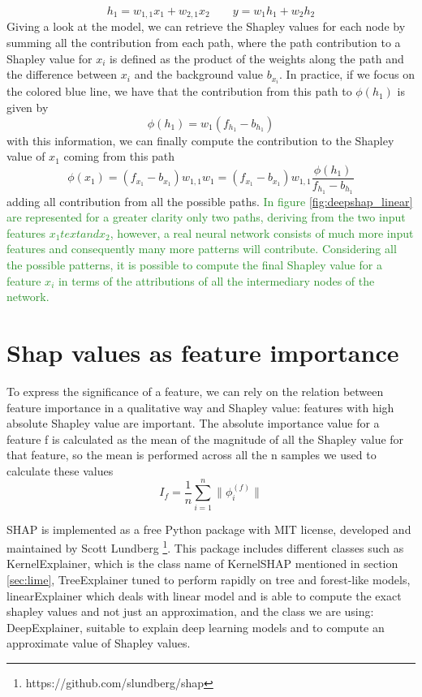 \documentclass[11pt]{report}
\begin{document}
\[
h_1 = w_{1, 1}x_1 + w_{2, 1}x_2 \qquad y = w_1 h_1 + w_2 h_2
\]
Giving a look at the model, we can retrieve the Shapley values for each node by summing all the contribution from each path, where the path contribution to a Shapley value for $x_i$ is defined as the product of the weights along the path and the difference between $x_i$ and the background value $b_{x_i}$.
In practice, if we focus on the colored blue line, we have that the contribution from this path to $\phi(h_1)$ is given by
\[
\phi(h_1) = w_1 (f_{h_1} - b_{h_1})
\]
with this information, we can finally compute the contribution to the Shapley value of $x_1$ coming from this path
\begin{equation}
\phi(x_1) = (f_{x_1} - b_{x_1}) w_{1, 1} w_1 = (f_{x_1} - b_{x_1}) w_{1, 1} \frac{\phi(h_1)}{f_{h_1} - b_{h_1}}
\end{equation}
adding all contribution from all the possible paths.
\textcolor{ForestGreen}{
In figure \ref{fig:deepshap_linear} are represented for a greater clarity only two paths, deriving from the two input features $x_1 text{and} x_2$, however, a real neural network consists of much more input features and consequently many more patterns will contribute.
Considering all the possible patterns, it is possible to compute the final Shapley value for a feature $x_i$ in terms of the attributions of all the intermediary nodes of the network.
}


\section{Shap values as feature importance}

To express the significance of a feature, we can rely on the relation between feature importance in a qualitative way and Shapley value: features with high absolute Shapley value are important.
The absolute importance value for a feature f is calculated as the mean of the magnitude of all the Shapley value for that feature, so the mean is performed across all the n samples we used to calculate these values
\begin{equation}\label{eq:shap_magnitude}
I_f = \frac{1}{n} \sum_{i = 1}^n \|\phi_i^{(f)}\|
\end{equation}

SHAP is implemented as a free Python package with MIT license, developed and maintained by Scott Lundberg \footnote{https://github.com/slundberg/shap}.
This package includes different classes such as KernelExplainer, which is the class name of KernelSHAP mentioned in section \ref{sec:lime}, TreeExplainer tuned to perform rapidly on tree and forest-like models, linearExplainer which deals with linear model and is able to compute the exact shapley values and not just an approximation, and the class we are using: DeepExplainer, suitable to explain deep learning models and to compute an approximate value of Shapley values.
\end{document}
